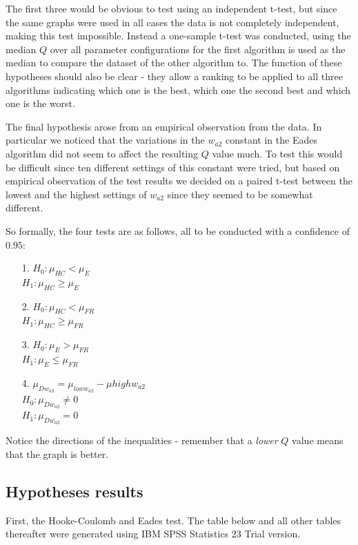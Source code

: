 \documentclass[a4paper,12pt]{article}
\begin{document}
  The first three would be obvious to test using an independent t-test, but since the same graphs were used in all cases the data is not completely independent, making this test impossible. Instead a one-sample t-test was conducted, using the median $Q$ over all parameter configurations for the first algorithm is used as the median to compare the dataset of the other algorithm to. The function of these hypotheses should also be clear - they allow a ranking to be applied to all three algorithms indicating which one is the best, which one the second best and which one is the worst.
  
  The final hypothesis arose from an empirical observation from the data. In particular we noticed that the variations in the $w_{a2}$ constant in the Eades algorithm did not seem to affect the resulting $Q$ value much. To test this would be difficult since ten different settings of this constant were tried, but based on empirical observation of the test results we decided on a paired t-test between the lowest and the highest settings of $w_{a2}$ since they seemed to be somewhat different.
  
  So formally, the four tests are as follows, all to be conducted with a confidence of $0.95$:
  \begin{itemize}
  	\item[1.] $H_{0}: \mu_{HC} < \mu_{E}$ \\
			  $H_{1}: \mu_{HC} \geq \mu_{E}$
	\item[2.] $H_{0}: \mu_{HC} < \mu_{FR}$ \\
			  $H_{1}: \mu_{HC} \geq \mu_{FR}$
	\item[3.] $H_{0}: \mu_{E} > \mu_{FR}$ \\
		      $H_{1}: \mu_{E} \leq \mu_{FR}$
	\item[4.] $\mu_{Dw_{a2}} = \mu_{loww_{a2}} - \mu{highw_{a2}}$ \\
			  $H_{0}: \mu_{Dw_{a2}} \neq 0$ \\
			  $H_{1}: \mu_{Dw_{a2}} = 0$
  \end{itemize}
  
  Notice the directions of the inequalities - remember that a \emph{lower} $Q$ value means that the graph is better.
  
  \subsection{Hypotheses results}
  First, the Hooke-Coulomb and Eades test. The table below and all other tables thereafter were generated using IBM SPSS Statistics 23 Trial version.
  
\end{document}
